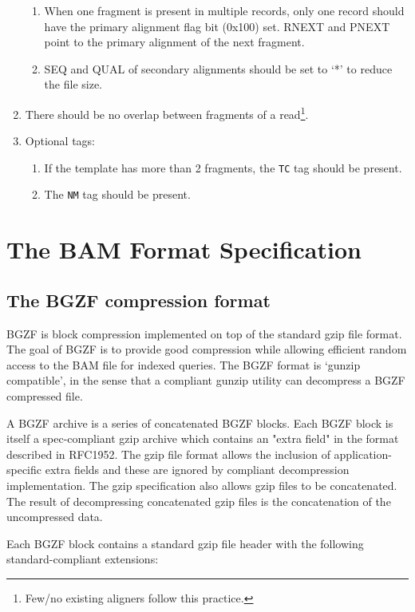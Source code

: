 \documentclass[10pt]{article}
\begin{document}
\begin{enumerate}
\begin{enumerate}[label*=\arabic*]
  \item When one fragment is present in multiple records, only one
    record should have the primary alignment flag bit (0x100) set. {\sf
      RNEXT} and {\sf PNEXT} point to the primary alignment of the next
    fragment.
  \item {\sf SEQ} and {\sf QUAL} of secondary alignments should be set
    to `*' to reduce the file size.
  \end{enumerate}
\item There should be no overlap between fragments of a read\footnote{Few/no
  existing aligners follow this practice.}.
\item Optional tags:
  \begin{enumerate}[label*=\arabic*]
  \item If the template has more than 2 fragments, the {\tt TC} tag
    should be present.
  \item The {\tt NM} tag should be present.
  \end{enumerate}
\end{enumerate}

\pagebreak

\section{The BAM Format Specification}

\subsection{The BGZF compression format}

BGZF is block compression implemented on top of the standard gzip file
format. The goal of BGZF is to provide good compression while allowing
efficient random access to the BAM file for indexed queries. The BGZF
format is `gunzip compatible', in the sense that a compliant gunzip
utility can decompress a BGZF compressed file.

A BGZF archive is a series of concatenated BGZF blocks. Each BGZF block
is itself a spec-compliant gzip archive which contains an "extra field"
in the format described in RFC1952. The gzip file format allows the
inclusion of application-specific extra fields and these are ignored by
compliant decompression implementation. The gzip specification also
allows gzip files to be concatenated. The result of decompressing
concatenated gzip files is the concatenation of the uncompressed data.

Each BGZF block contains a standard gzip file header with the following
standard-compliant extensions:
\end{document}
